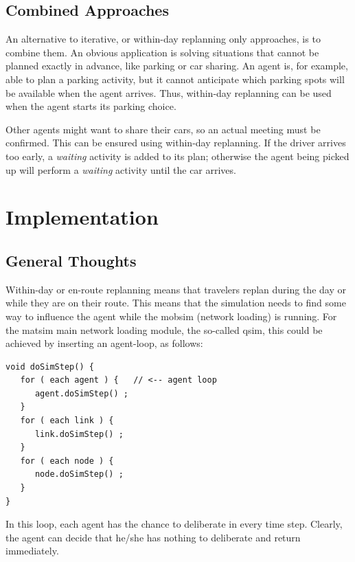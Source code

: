 \subsection{Combined Approaches} 
\label{sec:CombinedApproaches}
An alternative to iterative, or within-day replanning only approaches, is to combine them. An obvious application is solving situations that cannot be planned exactly in advance, like parking or car sharing. An agent is, for example, able to plan a parking activity, but it cannot anticipate which parking spots will be available when the agent arrives. Thus, within-day replanning can be used when the agent starts its parking choice.

Other agents might want to share their cars, so an actual meeting must be confirmed. This can be ensured using within-day replanning. If the driver arrives too early, a \emph{waiting} activity is added to its plan; otherwise the agent being picked up will perform a \emph{waiting} activity until the car arrives.

\section{Implementation}
\subsection{General Thoughts}
Within-day or en-route replanning means that travelers replan during the day or while they are on their route. This means that the simulation needs to find some way to influence the agent while the \gls{mobsim} (network loading) is running. For the \gls{matsim} main network loading module, the so-called \gls{qsim}, this could be achieved by inserting an agent-loop, as follows:
\begin{lstlisting}
void doSimStep() {
   for ( each agent ) {   // <-- agent loop
      agent.doSimStep() ;
   }
   for ( each link ) {
      link.doSimStep() ;
   }
   for ( each node ) {
      node.doSimStep() ;
   }
}  
\end{lstlisting}
In this loop, each agent has the chance to deliberate in every time step. Clearly, the agent can decide that he/she has nothing to deliberate and return immediately.

